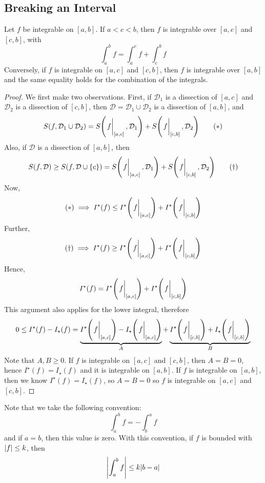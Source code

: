 \documentclass{article}
\begin{document}
\subsection{Breaking an Interval}
Let $f$ be integrable on $[a, b]$. If $a < c < b$, then $f$ is integrable over $[a, c]$ and $[c, b]$, with
\[ \int_a^b f = \int_a^c f + \int_c^b f \]
Conversely, if $f$ is integrable on $[a, c]$ and $[c, b]$, then $f$ is integrable over $[a, b]$ and the same equality holds for the combination of the integrals.
\begin{proof}
	We first make two observations. First, if $\mathcal D_1$ is a dissection of $[a, c]$ and $\mathcal D_2$ is a dissection of $[c, b]$, then $\mathcal D = \mathcal D_1 \cup \mathcal D_2$ is a dissection of $[a, b]$, and
	\begin{equation}
		S(f, \mathcal D_1 \cup \mathcal D_2) = S\qty(\eval{f}_{[a, c]}, \mathcal D_1) + S\qty(\eval{f}_{[c, b]}, \mathcal D_2)
		\tag{$\ast$}
	\end{equation}
	Also, if $\mathcal D$ is a dissection of $[a, b]$, then
	\begin{equation}
		S(f, \mathcal D) \geq S(f, \mathcal D \cup \{ c \}) = S\qty(\eval{f}_{[a, c]}, \mathcal D_1) + S\qty(\eval{f}_{[c, b]}, \mathcal D_2)
		\tag{$\dagger$}
	\end{equation}
	Now,
	\[ (\ast) \implies I^\star(f) \leq I^\star\qty(\eval{f}_{[a, c]}) + I^\star\qty(\eval{f}_{[c, b]}) \]
	Further,
	\[ (\dagger) \implies I^\star(f) \geq I^\star\qty(\eval{f}_{[a, c]}) + I^\star\qty(\eval{f}_{[c, b]}) \]
	Hence,
	\[ I^\star(f) = I^\star\qty(\eval{f}_{[a, c]}) + I^\star\qty(\eval{f}_{[c, b]}) \]
	This argument also applies for the lower integral, therefore
	\[ 0 \leq I^\star(f) - I_\star(f) = \underbrace{I^\star\qty(\eval{f}_{[a, c]}) - I_\star\qty(\eval{f}_{[a, c]})}_{A} + \underbrace{I^\star\qty(\eval{f}_{[c, b]}) + I_\star\qty(\eval{f}_{[c, b]})}_{B} \]
	Note that $A, B \geq 0$. If $f$ is integrable on $[a, c]$ and $[c, b]$, then $A = B = 0$, hence $I^\star(f) = I_\star(f)$ and it is integrable on $[a, b]$. If $f$ is integrable on $[a, b]$, then we know $I^\star(f) = I_\star(f)$, so $A = B = 0$ so $f$ is integrable on $[a, c]$ and $[c, b]$.
\end{proof}
\noindent Note that we take the following convention:
\[ \int_a^b f = -\int_b^a f \]
and if $a=b$, then this value is zero. With this convention, if $f$ is bounded with $\abs{f} \leq k$, then
\[ \abs{\int_a^b f} \leq k\abs{b - a} \]
\end{document}
